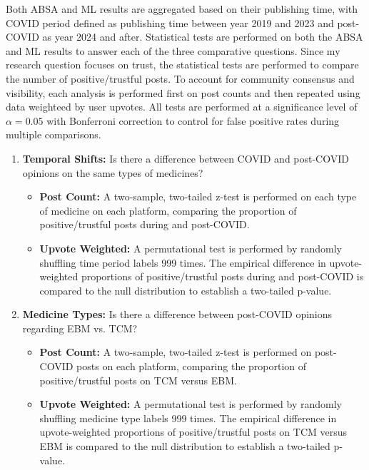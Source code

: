 \documentclass[11pt]{article}
\begin{document}
Both ABSA and ML results are aggregated based on their publishing time, with COVID period defined as publishing time between year 2019 and 2023 and post-COVID as year 2024 and after. Statistical tests are performed on both the ABSA and ML results to answer each of the three comparative questions. Since my research question focuses on trust, the statistical tests are performed to compare the number of positive/trustful posts. To account for community consensus and visibility, each analysis is performed first on post counts and then repeated using data weighteed by user upvotes. All tests are performed at a significance level of $\alpha=0.05$ with Bonferroni correction to control for false positive rates during multiple comparisons.
\begin{enumerate}
    \item \textbf{Temporal Shifts:} Is there a difference between COVID and post-COVID opinions on the same types of medicines?
    \begin{itemize}
        \item \textbf{Post Count:} A two-sample, two-tailed z-test is performed on each type of medicine on each platform, comparing the proportion of positive/trustful posts during and post-COVID.
        \item \textbf{Upvote Weighted:} A permutational test is performed by randomly shuffling time period labels 999 times. The empirical difference in upvote-weighted proportions of positive/trustful posts during and post-COVID is compared to the null distribution to establish a two-tailed p-value.
    \end{itemize}

    \item \textbf{Medicine Types:} Is there a difference between post-COVID opinions regarding EBM vs. TCM?
    \begin{itemize}
        \item \textbf{Post Count:} A two-sample, two-tailed z-test is performed on post-COVID posts on each platform, comparing the proportion of positive/trustful posts on TCM versus EBM.
        \item \textbf{Upvote Weighted:} A permutational test is performed by randomly shuffling medicine type labels 999 times. The empirical difference in upvote-weighted proportions of positive/trustful posts on TCM versus EBM is compared to the null distribution to establish a two-tailed p-value.
    \end{itemize}


\end{enumerate}
\end{document}
